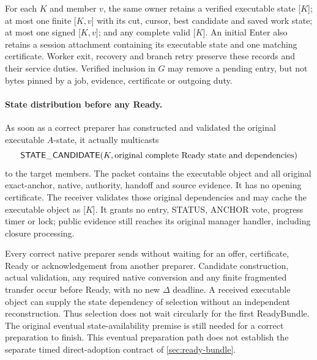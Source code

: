 For each $K$ and member $v$, the same owner retains a verified executable
state [$K$]; at most one finite
[$K,v$] with its cut, cursor, best candidate and saved
work state; at most one signed [$K,v$]; and any complete valid
[$K$]. An initial Enter also retains a session attachment
containing its executable state and one matching certificate.
Worker exit, recovery and branch retry preserve these records and their
service duties. Verified inclusion in $G$ may remove a pending entry,
but not bytes pinned by a job, evidence, certificate or outgoing duty.

\paragraph{State distribution before any Ready.}
As soon as a correct preparer has constructed and validated the original
executable $A$-state, it actually multicasts
\[
 \mathsf{STATE\_CANDIDATE}
   (K,\text{original complete Ready state and dependencies})
\]
to the target members. The packet contains the executable object and
all original exact-anchor, native, authority, handoff and source evidence.
It has no opening certificate. The receiver validates those original
dependencies and may cache the executable object as
[$K$]. It grants no entry, STATUS, ANCHOR vote,
progress timer or lock; public evidence still reaches its original
manager handler, including closure processing.

Every correct native preparer sends without waiting for an offer,
certificate, Ready or acknowledgement from another preparer. Candidate
construction, actual validation, any required native conversion and any
finite fragmented transfer occur before Ready, with no new $\Delta$
deadline. A received executable object can supply the state dependency
of selection without an independent reconstruction. Thus selection
does not wait circularly for the first ReadyBundle. The original eventual
state-availability premise is still needed for a correct preparation to
finish. This eventual preparation path does not establish the separate
timed direct-adoption contract of \cref{sec:ready-bundle}.

